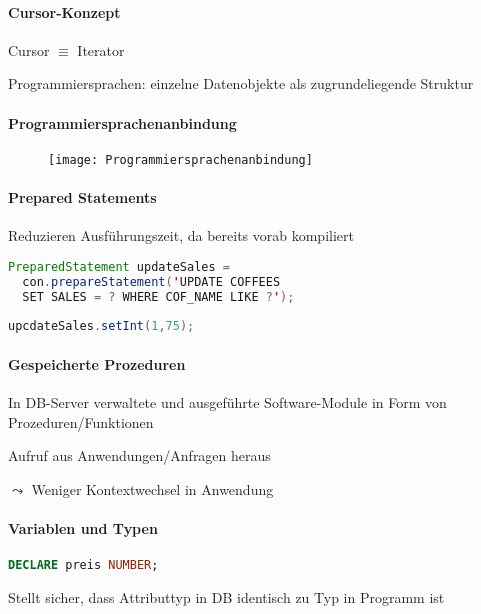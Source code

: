 \paragraph{Cursor-Konzept}
\begin{items}
	\item Cursor \( \equiv \) Iterator
	\item Programmiersprachen: einzelne Datenobjekte als zugrundeliegende Struktur
\end{items}



\paragraph{Programmiersprachenanbindung}
\begin{figure}[H]\centering\label{Programmiersprachenanbindung}\texttt{[image: Programmiersprachenanbindung]}\end{figure}

\paragraph{Prepared Statements}
\begin{items}
	\item Reduzieren Ausführungszeit, da bereits vorab kompiliert
	\item
		\begin{lstlisting}[language=java,showstringspaces=false]
PreparedStatement updateSales = 
  con.prepareStatement('UPDATE COFFEES 
  SET SALES = ? WHERE COF_NAME LIKE ?');
		\end{lstlisting}
	\item \lstinline[language=java]{upcdateSales.setInt(1,75);}
\end{items}

\paragraph{Gespeicherte Prozeduren}
\begin{items}
	\item In DB-Server verwaltete und ausgeführte Software-Module in Form von Prozeduren/Funktionen
	\item Aufruf aus Anwendungen/Anfragen heraus
	\item \( \leadsto \) Weniger Kontextwechsel in Anwendung
\end{items}

\paragraph{Variablen und Typen}
\begin{items}
	\item \lstinline[language=sql]{DECLARE preis NUMBER;}
	\item Stellt sicher, dass Attributtyp in DB identisch zu Typ in Programm ist
\end{items}

